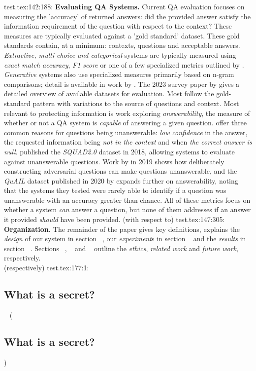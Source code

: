 test.tex:142:188: \textbf{Evaluating QA Systems.} Current QA evaluation focuses on measuring the 'accuracy' of returned answers: did the provided answer satisfy the information requirement of the question with respect to the context? These measures are typically evaluated against a 'gold standard' dataset. These gold standards contain, at a minimum: contexts, questions and acceptable answers. \textit{Extractive, multi-choice and categorical} systems are typically measured using \textit{exact match accuracy}, \textit{F1 score} or one of a few specialized metrics outlined by \citeauthor{Baradaran2022}. \textit{Generative} systems also use specialized measures primarily based on n-gram comparisons; detail is available in work by \citeauthor{Baradaran2022}. The 2023 survey paper by \citeauthor{Rogers2023} gives a detailed overview of available datasets for evaluation. Most follow the gold-standard pattern with variations to the source of questions and context. Most relevant to protecting information is work exploring \textit{answerability}, the measure of whether or not a QA system is \textit{capable} of answering a given question. \citeauthor{Roy2021} offer three  common reasons for questions being unanswerable: \textit{low confidence} in the answer, the requested information being \textit{not in the context} and when \textit{the correct answer is null}. \citeauthor{Rajpurkar2018} published the \textit{SQUAD2.0} dataset in 2018, allowing systems to evaluate against unanswerable questions. Work by \citeauthor{Wallace2019} in 2019 shows how deliberately constructing adversarial questions can make questions unanswerable, and the \textit{QuAIL} dataset published in 2020 by \citeauthor{Rogers2020} expands further on answerability, noting that the systems they tested were rarely able to identify if a question was unanswerable with an accuracy greater than chance. All of these metrics focus on whether a system \textit{can} answer a question, but none of them addresses if an answer it provided \textit{should} have been provided. (with respect to)
test.tex:147:305: \textbf{Organization.} The remainder of the paper gives key definitions, explains the \textit{design} of our system in section ~, our \textit{experiment}s in section ~ and the \textit{results} in section ~. Sections ~, ~ and ~ outline the \textit{ethics}, \textit{related work} and \textit{future work}, respectively.\\  (respectively)
test.tex:177:1: \subsection{What is a secret?} ~ (\subsection{What is a secret?})
